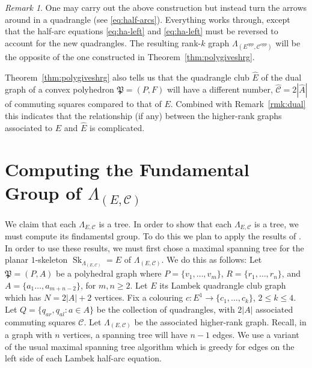\documentclass[12pt]{amsart}
\theoremstyle{definition}
\theoremstyle{remark}
\newtheorem{rmk}[thm]{Remark}
\numberwithin{equation}{section}
\newcommand{\Cc}{\mathcal{C}}
\newcommand{\Sk}{\operatorname{Sk}}
\begin{document}
\begin{rmk} \label{rmk:opposite}
One may carry out the above construction but instead turn the arrows around in a quadrangle (see \eqref{eq:half-arcs}). Everything works through, except that the half-arc equations \eqref{eq:ha-left} and \eqref{eq:ha-left} must be reversed to account for the new quadrangles. The resulting rank-$k$ graph $\Lambda_{(E^{opp},\Cc^{opp})}$ will be the opposite of the one constructed in Theorem~\ref{thm:polygiveshrg}.

Theorem~\ref{thm:polygiveshrg} also tells us that the quadrangle club $\hat{E}$ of the dual graph of a convex polyhedron $\mathfrak{P}=(P,F)$ will have a different number, $\hat{\mathcal{C}} = 2|\hat{A}|$ of commuting squares compared to that of $E$. Combined with Remark~\ref{rmk:dual} this indicates that the relationship (if any) between the higher-rank graphs associated to $E$ and $\hat{E}$ is complicated.
\end{rmk}

\section{Computing the Fundamental Group of $\Lambda_{(E,\Cc)}$} \label{sec:five}

\noindent
We claim that each $\Lambda_{E,\mathcal{C}}$ is a tree. In order to show that each $\Lambda_{E,\mathcal{C}}$ is a tree, we must compute its findamentsl group. To do this we plan to apply the results of \cite{KPW}. In order to use these results, we must first chose a maximal spanning tree for the planar $1$-skeleton $\Sk_{\Lambda_{(E,\Cc)}}=E$  of $\Lambda_{(E,\Cc)}$. We do this as follows: Let $\mathfrak{P}=(P,A)$ be a polyhedral graph
where $P=\{ v_1 , \ldots , v_{m} \}$,  $R= \{ r_1 , \ldots , r_{n} \}$, and $A= \{ a_1 \ldots  , a_{m+n-2} \}$,  for $m,n \ge 2$. Let $E$ its Lambek quadrangle club graph which has $N=2 |A|+2$ vertices. Fix a colouring $c : E^1 \to \{ c_1 , \ldots , c_k \}$, $2 \le k \le 4$.  Let $Q = \{ q_{ar} , q_{al} : a \in A \}$ be the collection of quadrangles, with $2 |A|$ associated commuting squares $\Cc$. Let $\Lambda_{(E,\Cc)}$ be the associated higher-rank graph. Recall, in a graph with $n$ vertices, a spanning tree will have $n-1$ edges. We use a variant of the usual maximal spanning tree algorithm which is greedy for edges on the left side of each Lambek half-arc equation.
\end{document}
